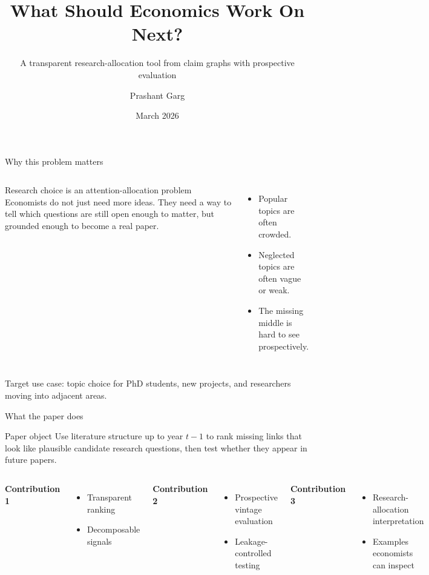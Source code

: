 \documentclass[aspectratio=169,11pt]{beamer}
\title{What Should Economics Work On Next?}
\subtitle{A transparent research-allocation tool from claim graphs with prospective evaluation}
\author{Prashant Garg}
\date{March 2026}
\begin{document}
\begin{frame}[plain,label=main-title]
  \titlepage
\end{frame}

\begin{frame}[label=main-why]{Why this problem matters}
\begin{columns}[T]
\begin{block}{Research choice is an attention-allocation problem}
\large
Economists do not just need more ideas. They need a way to tell which questions are still open enough to matter, but grounded enough to become a real paper.
\end{block}

\small
\begin{itemize}
  \item Popular topics are often crowded.
  \item Neglected topics are often vague or weak.
  \item The missing middle is hard to see prospectively.
\end{itemize}
\end{columns}

\vspace{0.6em}
\small
Target use case: topic choice for PhD students, new projects, and researchers moving into adjacent areas.
\end{frame}

\begin{frame}[label=main-what]{What the paper does}
\begin{block}{Paper object}
Use literature structure up to year \(t-1\) to rank missing links that look like plausible candidate research questions, then test whether they appear in future papers.
\end{block}

\vspace{0.4em}
\begin{columns}[T]
\textbf{Contribution 1}
\begin{itemize}
  \item Transparent ranking
  \item Decomposable signals
\end{itemize}

\textbf{Contribution 2}
\begin{itemize}
  \item Prospective vintage evaluation
  \item Leakage-controlled testing
\end{itemize}

\textbf{Contribution 3}
\begin{itemize}
  \item Research-allocation interpretation
  \item Examples economists can inspect
\end{itemize}
\end{columns}
\end{frame}
\end{document}
